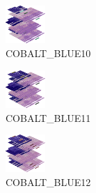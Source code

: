 \hspace{0.1cm}
\begin{minipage}[b]{0.15\linewidth}
\begin{figure}[H]                                                          
  \centering                                                             
  \begin{adjustbox}{width=1.5cm,center}                                   
  \includegraphics[width=1.5cm]{src/colorspace_colourflow/flows/colourflow_106-45.png}%
  \end{adjustbox}                                                        
\caption*{COBALT\_BLUE10}                                           
\end{figure}                                                               
\end{minipage}
\hspace{0.1cm}
\begin{minipage}[b]{0.15\linewidth}
\begin{figure}[H]                                                          
  \centering                                                             
  \begin{adjustbox}{width=1.5cm,center}                                   
  \includegraphics[width=1.5cm]{src/colorspace_colourflow/flows/colourflow_107-45.png}%
  \end{adjustbox}                                                        
\caption*{COBALT\_BLUE11}                                           
\end{figure}                                                               
\end{minipage}
\hspace{0.1cm}
\begin{minipage}[b]{0.15\linewidth}
\begin{figure}[H]                                                          
  \centering                                                             
  \begin{adjustbox}{width=1.5cm,center}                                   
  \includegraphics[width=1.5cm]{src/colorspace_colourflow/flows/colourflow_108-45.png}%
  \end{adjustbox}                                                        
\caption*{COBALT\_BLUE12}                                           
\end{figure}                                                               
\end{minipage}
